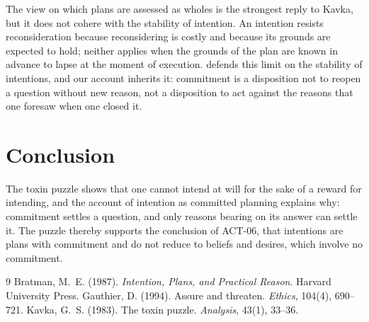 \documentclass{situationist-preprint}
\begin{document}
\begin{reply}
The view on which plans are assessed as wholes is the strongest reply to Kavka, but it does not cohere with the stability of intention. An intention resists reconsideration because reconsidering is costly and because its grounds are expected to hold; neither applies when the grounds of the plan are known in advance to lapse at the moment of execution. \citet{Bratman1987} defends this limit on the stability of intentions, and our account inherits it: commitment is a disposition not to reopen a question without new reason, not a disposition to act against the reasons that one foresaw when one closed it.
\end{reply}

\section{Conclusion}

The toxin puzzle shows that one cannot intend at will for the sake of a reward for intending, and the account of intention as committed planning explains why: commitment settles a question, and only reasons bearing on its answer can settle it. The puzzle thereby supports the conclusion of ACT-06, that intentions are plans with commitment and do not reduce to beliefs and desires, which involve no commitment.

\begin{thebibliography}{9}
 Bratman, M.~E. (1987). \emph{Intention, Plans, and Practical Reason}. Harvard University Press.
 Gauthier, D. (1994). Assure and threaten. \emph{Ethics}, 104(4), 690--721.
 Kavka, G.~S. (1983). The toxin puzzle. \emph{Analysis}, 43(1), 33--36.
\end{thebibliography}
\end{document}
